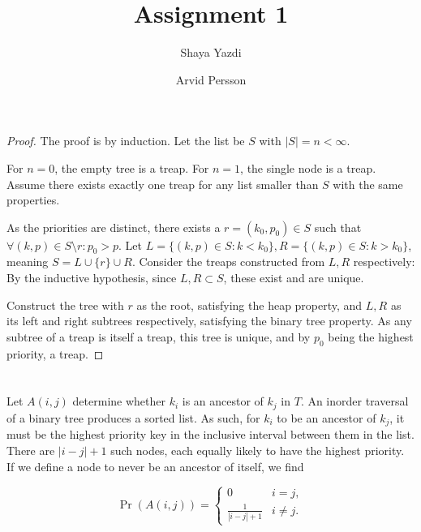 \documentclass{article}
\title{Assignment 1}
\author{Shaya Yazdi \and Arvid Persson}
\begin{document}
\maketitle

\section{}

\begin{proof}
    The proof is by induction. Let the list be $S$ with $|S| = n < \infty$.

    For $n = 0$, the empty tree is a treap. For $n = 1$, the single node is a
    treap. Assume there exists exactly one treap for any list smaller than $S$
    with the same properties.

    As the priorities are distinct, there exists a $r = (k_0, p_0) \in S$ such
    that $\forall (k, p) \in S \setminus r: p_0 > p$. Let $L = \{ (k, p) \in S:
    k < k_0 \}, R = \{ (k, p) \in S: k > k_0 \}$, meaning $S = L \cup \{r\}
    \cup R$. Consider the treaps constructed from $L, R$ respectively: By the
    inductive hypothesis, since $L, R \subset S$, these exist and are unique.

    Construct the tree with $r$ as the root, satisfying the heap property, and
    $L, R$ as its left and right subtrees respectively, satisfying the binary
    tree property. As any subtree of a treap is itself a treap, this tree is
    unique, and by $p_0$ being the highest priority, a treap.
\end{proof}

\section{}

Let $A(i, j)$ determine whether $k_i$ is an ancestor of $k_j$ in $T$. An
inorder traversal of a binary tree produces a sorted list. As such, for $k_i$
to be an ancestor of $k_j$, it must be the highest priority key in the
inclusive interval between them in the list. There are $|i - j| + 1$ such
nodes, each equally likely to have the highest priority. If we define a node to
never be an ancestor of itself, we find

\begin{equation*}
    \Pr(A(i, j)) =
    \begin{cases}
	0 & i = j, \\
	\frac{1}{|i - j| + 1} & i \neq j.
    \end{cases}
\end{equation*}
\end{document}
